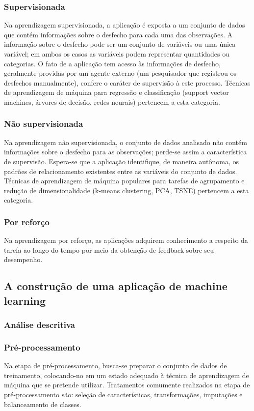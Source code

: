 \subsubsection{Supervisionada}
Na aprendizagem supervisionada, a aplicação é exposta a um conjunto de dados que contém informações sobre o desfecho
para cada uma das observações. A informação sobre o desfecho pode ser um conjunto de variáveis ou uma única variável;
em ambos os casos as variáveis podem representar quantidades ou categorias. O fato de a aplicação tem acesso às informações
de desfecho, geralmente providas por um agente externo (um pesquisador que registrou os desfechos manualmente), confere o
caráter de supervisão à este processo. Técnicas de aprendizagem de máquina para regressão e classificação (support vector
machines, árvores de decisão, redes neurais) pertencem a esta categoria.

\subsubsection{Não supervisionada}
Na aprendizagem não supervisionada, o conjunto de dados analisado não contém informações sobre o desfecho para
as observações; perde-se assim a característica de supervisão. Espera-se que a aplicação identifique, de maneira
autônoma, os padrões de relacionamento existentes entre as variáveis do conjunto de dados. Técnicas de aprendizagem de
máquina populares para tarefas de agrupamento e redução de dimensionalidade (k-means clustering, PCA, TSNE) pertencem
a esta categoria.

\subsubsection{Por reforço}
Na aprendizagem por reforço, as aplicações adquirem conhecimento a respeito da tarefa ao longo do tempo por meio da obtenção
de feedback sobre seu desempenho.

\subsection{A construção de uma aplicação de machine learning}
\subsubsection{Análise descritiva}
\subsubsection{Pré-processamento}
Na etapa de pré-processamento, busca-se preparar o conjunto de dados de treinamento, colocando-no em um estado adequado à técnica
de aprendizagem de máquina que se pretende utilizar. Tratamentos comumente realizados na etapa de pré-processamento são: seleção de
características, transformações, imputações e balanceamento de classes.

